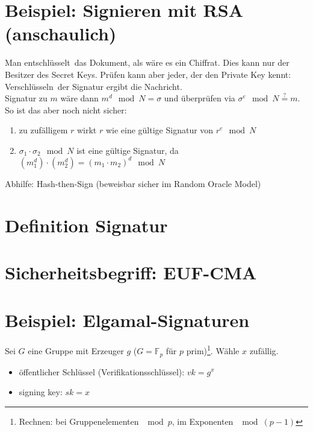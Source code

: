 \documentclass[a4paper,twoside,DIV15,BCOR12mm]{scrbook}
\begin{document}
\section{Beispiel: Signieren mit RSA (anschaulich)}

Man \glqq entschlüsselt\grqq\ das Dokument, als wäre es ein Chiffrat. Dies kann nur der Besitzer des Secret Keys. Prüfen kann aber jeder, der den Private Key kennt: \glqq Verschlüsseln\grqq\ der Signatur ergibt die Nachricht.\\ Signatur zu $m$ wäre dann $m^d \mod N = \sigma$ und überprüfen via $\sigma^e \mod N \stackrel{?}{=} m$.\\

So ist das aber noch nicht sicher:

\begin{enumerate}
	\item zu zufälligem $r$ wirkt $r$ wie eine gültige Signatur von $r^e \mod N$
	\item $\sigma_1 \cdot \sigma_2 \mod N$ ist eine gültige Signatur, da $(m_1^d) \cdot (m_2^d) = (m_1 \cdot m_2)^d \mod N$
\end{enumerate}

Abhilfe: Hash-then-Sign (beweisbar sicher im Random Oracle Model)

\section{Definition Signatur}


\section{Sicherheitsbegriff: EUF-CMA}

\section{Beispiel: Elgamal-Signaturen}

Sei $G$ eine Gruppe mit Erzeuger $g$ ($G = \mathbb{F}_p$ für $p$ prim)\footnote{Rechnen: bei Gruppenelementen $\mod{p}$, im Exponenten $\mod{(p-1)}$}. Wähle $x$ zufällig.

\begin{itemize}
	\item öffentlicher Schlüssel (Verifikationsschlüssel): $vk = g^x$
	\item signing key: $sk = x$
\end{itemize}
\end{document}

